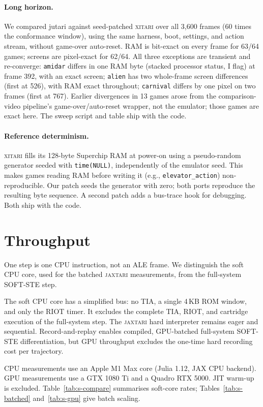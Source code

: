 \documentclass[letterpaper]{article} %
\begin{document}
\paragraph{Long horizon.}
We compared jutari against seed-patched \textsc{xitari}
over all 3,600 frames (60 times the conformance window),
using the same harness, boot, settings, and action stream,
without game-over auto-reset. RAM is bit-exact on every frame
for 63/64 games; screens are pixel-exact for 62/64.
All three exceptions are transient and re-converge:
\texttt{amidar} differs in one RAM byte (stacked processor
status, I flag) at frame 392, with an exact screen;
\texttt{alien} has two whole-frame screen differences
(first at 526), with RAM exact throughout;
\texttt{carnival} differs by one pixel on two frames
(first at 767). Earlier divergences in 13 games arose
from the comparison-video pipeline's game-over/auto-reset
wrapper, not the emulator; those games are exact here.
The sweep script and table ship with the code.

\paragraph{Reference determinism.}
\textsc{xitari} fills its 128-byte Superchip RAM at power-on
using a pseudo-random generator seeded with \texttt{time(NULL)},
independently of the emulator seed. This makes games reading
RAM before writing it (e.g., \texttt{elevator\_action})
non-reproducible. Our patch seeds the generator with zero;
both ports reproduce the resulting byte sequence. A second
patch adds a bus-trace hook for debugging. Both ship with the code.

\section{Throughput}

One step is one CPU instruction, not an ALE
frame. We distinguish the soft CPU core, used
for the batched \textsc{jaxtari} measurements,
from the full-system SOFT-STE step.

The soft CPU core has a simplified bus:
no TIA, a single 4\,KB ROM window, and only
the RIOT timer. It excludes the complete TIA,
RIOT, and cartridge execution of the full-system
step. The \textsc{jaxtari} hard interpreter remains eager
and sequential. Record-and-replay enables compiled,
GPU-batched full-system SOFT-STE differentiation,
but GPU throughput excludes the one-time hard
recording cost per trajectory.

CPU measurements use an Apple M1 Max core
(Julia 1.12, JAX CPU backend). GPU measurements
use a GTX 1080 Ti and a Quadro RTX 5000.
JIT warm-up is excluded. Table~\ref{tab:s-compare}
summarises soft-core rates; Tables~\ref{tab:s-batched}
and~\ref{tab:s-gpu} give batch scaling.
\end{document}
